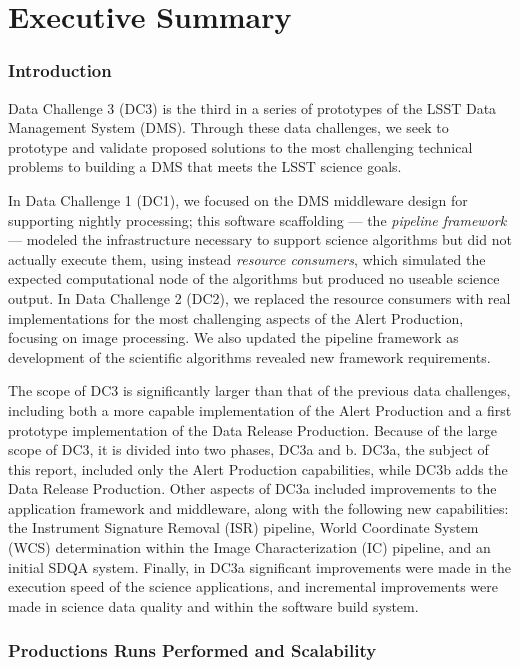\pagebreak
\section*{Executive Summary}

\subsubsection*{Introduction}

Data Challenge 3 (DC3) is the third in a series of prototypes of the
LSST Data Management System (DMS). Through these data challenges, we
seek to prototype and validate proposed solutions to the most challenging technical problems to building a
DMS that meets the LSST science goals.

In Data Challenge 1 (DC1), we focused on the DMS middleware design
for supporting nightly processing; this software scaffolding ---
the \textit{pipeline framework} --- modeled the infrastructure
necessary to support science algorithms but did not actually execute
them, using instead \textit{resource consumers}, which simulated the
expected computational node of the algorithms but produced no useable
science output.  In Data Challenge 2 (DC2), we replaced the resource
consumers with real implementations for the most challenging aspects of
the Alert Production, focusing on image processing. We also updated the pipeline
framework as development of the scientific algorithms revealed
new framework requirements.

The scope of DC3 is significantly larger than that of the previous
data challenges, including both a more capable implementation of the
Alert Production and a first prototype implementation of the Data
Release Production.  Because of the large scope of DC3, it is
divided into two phases, DC3a and b.  DC3a, the subject of this report, included only the Alert
Production capabilities, while DC3b adds the Data Release Production.
Other aspects of DC3a included improvements to the application framework
and middleware, along with the following new capabilities: the
Instrument Signature Removal (ISR) pipeline, World Coordinate System
(WCS) determination within the Image Characterization (IC) pipeline,
and an initial SDQA system. Finally, in DC3a significant improvements were 
made in the execution speed of the science applications,  and incremental improvements were 
made in science data quality and within the software build system.

\subsubsection*{Productions Runs Performed and Scalability}

